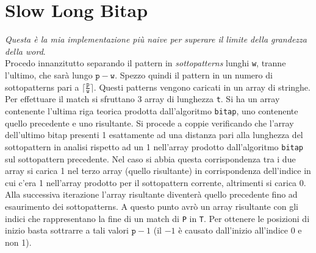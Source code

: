 \documentclass[a4paper,12pt, oneside]{article}
\begin{document}
\section*{Slow Long Bitap}
\textit{Questa è la mia implementazione più naive per superare il limite della
  grandezza della word}.\\
Procedo innanzitutto separando il pattern in \textit{sottopatterns}
lunghi \texttt{w}, tranne l'ultimo, che sarà lungo $\mathtt{p} -
\mathtt{w}$. Spezzo quindi il pattern in un numero di sottopatterns
pari a $\big\lceil \frac{\mathtt{p}}{\mathtt{w}}\big\rceil$. Questi patterns
vengono caricati in un array di stringhe.\\
Per effettuare il match si sfruttano 3 array di lunghezza
\texttt{t}. Si ha un array contenente l'ultima riga teorica prodotta
dall'algoritmo \texttt{bitap}, uno contenente quello precedente e uno
risultante. Si procede a coppie verificando che l'array dell'ultimo
bitap presenti 1 esattamente ad una distanza pari alla lunghezza del
sottopattern in analisi rispetto ad un 1 nell'array prodotto
dall'algoritmo \texttt{bitap} sul sottopattern precedente. Nel caso si
abbia questa corrispondenza tra i due array si carica 1 nel terzo array (quello
risultante) in corrispondenza dell'indice in cui c'era 1 nell'array
prodotto per il sottopattern corrente, altrimenti si carica 0. Alla
successiva iterazione l'array risultante diventerà quello precedente
fino ad esaurimento dei sottopatterns. A questo punto avrò un array
risultante con gli indici che rappresentano la fine di un match di
\texttt{P} in \texttt{T}. Per ottenere le posizioni di inizio basta
sottrarre a tali valori $\mathtt{p} - 1$ (il $-1$ è causato
dall'inizio all'indice 0 e non 1).
\end{document}
